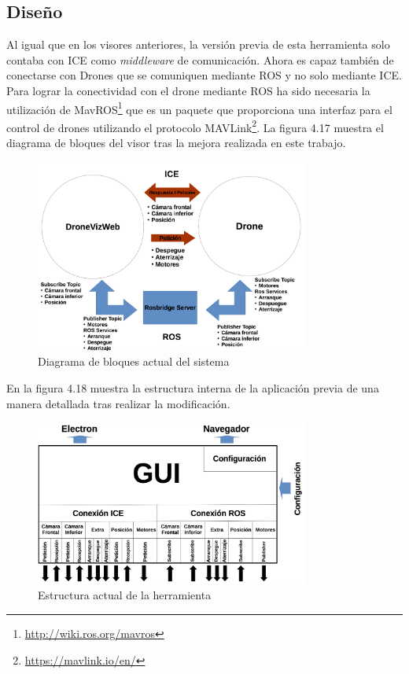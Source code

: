 \subsection{Diseño}
Al igual que en los visores anteriores, la versión previa de esta herramienta solo contaba con ICE como \textit{middleware} de comunicación. Ahora es capaz también de conectarse con Drones que se comuniquen mediante ROS y no solo mediante ICE. Para lograr la conectividad con el drone mediante ROS ha sido necesaria la utilización de MavROS\footnote{\url{http://wiki.ros.org/mavros}} que es un paquete que proporciona una interfaz para el control de drones utilizando el protocolo MAVLink\footnote{\url{https://mavlink.io/en/}}. La figura 4.17 muestra el diagrama de bloques del visor tras la mejora realizada en este trabajo.

\begin{figure}[H]
  \begin{center}
    \includegraphics[width=0.8\textwidth]{figures/DroneViz2.png}
		\caption{Diagrama de bloques actual del sistema}
		\label{fig.esquemaTurtleBot2}
		\end{center}
\end{figure}

En la figura 4.18 muestra la estructura interna de la aplicación previa de una manera detallada tras realizar la modificación.

\begin{figure}[H]
  \begin{center}
    \includegraphics[width=0.8\textwidth]{figures/estrucuturadroneviz2.png}
		\caption{Estructura actual de la herramienta}
		\label{fig.estructuracamviz2}
		\end{center}
\end{figure}

